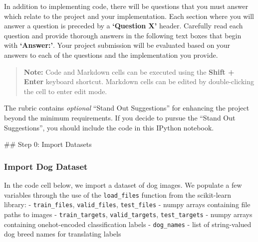 \documentclass[11pt]{article}
\begin{document}
In addition to implementing code, there will be questions that you must
answer which relate to the project and your implementation. Each section
where you will answer a question is preceded by a \textbf{`Question X'}
header. Carefully read each question and provide thorough answers in the
following text boxes that begin with \textbf{`Answer:'}. Your project
submission will be evaluated based on your answers to each of the
questions and the implementation you provide.

\begin{quote}
\textbf{Note:} Code and Markdown cells can be executed using the
\textbf{Shift + Enter} keyboard shortcut. Markdown cells can be edited
by double-clicking the cell to enter edit mode.
\end{quote}

The rubric contains \emph{optional} ``Stand Out Suggestions'' for
enhancing the project beyond the minimum requirements. If you decide to
pursue the ``Stand Out Suggestions'', you should include the code in
this IPython notebook.

 \#\# Step 0: Import Datasets

\hypertarget{import-dog-dataset}{%
\subsubsection{Import Dog Dataset}\label{import-dog-dataset}}

In the code cell below, we import a dataset of dog images. We populate a
few variables through the use of the \texttt{load\_files} function from
the scikit-learn library: - \texttt{train\_files},
\texttt{valid\_files}, \texttt{test\_files} - numpy arrays containing
file paths to images - \texttt{train\_targets}, \texttt{valid\_targets},
\texttt{test\_targets} - numpy arrays containing onehot-encoded
classification labels - \texttt{dog\_names} - list of string-valued dog
breed names for translating labels
\end{document}
